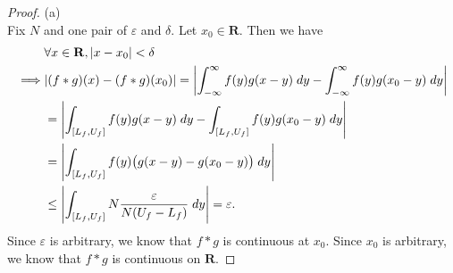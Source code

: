 \begin{proof}{(a)}
\[    \]
    Fix \(N\) and one pair of \(\varepsilon\) and \(\delta\).
    Let \(x_0 \in \mathbf{R}\).
    Then we have
    \begin{align*}
                 & \forall x \in \mathbf{R}, \abs*{x - x_0} < \delta                                                                                 \\
        \implies & \abs*{(f * g)(x) - (f * g)(x_0)} = \abs*{\int_{-\infty}^\infty f(y) g(x - y) \; dy - \int_{-\infty}^\infty f(y) g(x_0 - y) \; dy} \\
                 & = \abs*{\int_{[L_f, U_f]} f(y) g(x - y) \; dy - \int_{[L_f, U_f]} f(y) g(x_0 - y) \; dy}                                          \\
                 & = \abs*{\int_{[L_f, U_f]} f(y) \big(g(x - y) - g(x_0 - y)\big) \; dy}                                                             \\
                 & \leq \abs*{\int_{[L_f, U_f]} N \frac{\varepsilon}{N (U_f - L_f)} \; dy} = \varepsilon.
    \end{align*}
    Since \(\varepsilon\) is arbitrary, we know that \(f * g\) is continuous at \(x_0\).
    Since \(x_0\) is arbitrary, we know that \(f * g\) is continuous on \(\mathbf{R}\).
\end{proof}

